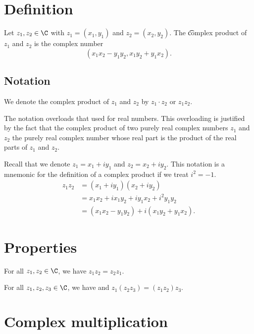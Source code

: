 
\section*{Definition}

Let $z_1, z_2 \in \C $ with $z_1 = (x_1, y_1)$ and $z_2 = (x_2, y_2)$.
The \t{complex product} of $z_1$ and $z_2$ is the complex number
  \[
(x_1x_2 - y_1y_2, x_1y_2 + y_1x_2).
  \]

\subsection*{Notation}

We denote the complex product of $z_1$ and $z_2$ by $z_1 \cdot  z_2$ or $z_1z_2$.

The notation overloads that used for real numbers.
This overloading is justified by the fact that the complex product of two purely real complex numbers $z_1$ and $z_2$ the purely real complex number whose real part is the product of the real parts of $z_1$ and $z_2$.

Recall that we denote $z_1 = x_1 + iy_1$ and $z_2 = x_2 + iy_2$.
This notation is a mnemonic for the definition of a complex product if we treat $i^2 = -1$.
  \[
\begin{aligned}
z_1z_2 &= (x_1 + iy_1)(x_2 + iy_2) \\
&= x_1x_2 + ix_1y_2 + iy_1x_2 + i^2 y_1y_2 \\
&= (x_1x_2 - y_1y_2) + i(x_1y_2 + y_1x_2).
\end{aligned}
  \]

\section*{Properties}

\begin{proposition}[Commutativity]
For all $z_1, z_2 \in \C $, we have $z_1z_2 = z_2z_1$.
\end{proposition}

\begin{proposition}[Associativity]
For all $z_1, z_2, z_3 \in \C $, we have
and $z_1(z_2z_3) = (z_1z_2)z_3$.
\end{proposition}

\section*{Complex multiplication}

